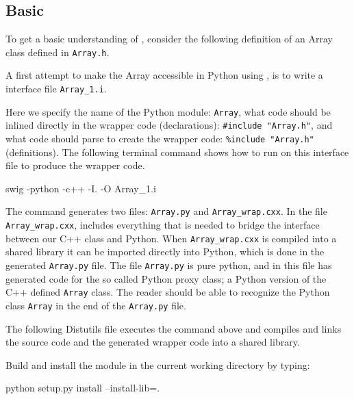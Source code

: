 \subsection{Basic \swig}
To get a basic understanding of \swig, consider the following definition of an Array class defined in \texttt{Array.h}.

A first attempt to make the Array accessible in Python using \swig, is to write a \swig interface file \texttt{Array\_1.i}.

Here we specify the name of the Python module: \texttt{Array}, what code should be inlined directly in the wrapper code (declarations): \texttt{\#include "Array.h"}, and what code \swig should parse to create the wrapper code: \texttt{\%include "Array.h"} (definitions). The following terminal command shows how to run \swig on this interface file to produce the wrapper code.
\begin{bash}
swig -python -c++ -I. -O Array_1.i
\end{bash}
The command generates two files: \texttt{Array.py} and \texttt{Array\_}\texttt{wrap.cxx}. In the file \texttt{Array\_}\texttt{wrap.cxx}, \swig includes everything that is needed to bridge the interface between our C++ class and Python. When \texttt{Array\_wrap.cxx} is compiled into a shared library it can be imported directly into Python, which is done in the generated \texttt{Array.py} file. The file \texttt{Array.py} is  pure python, and in this file \swig has generated code for the so called Python proxy class; a Python version of the C++ defined \texttt{Array} class. The reader should be able to recognize the Python class \texttt{Array} in the end of the \texttt{Array.py} file. \par

The following Distutils file executes the \swig command above and compiles and links the source code and the generated wrapper code into a shared library.

Build and install the module in the current working directory by typing:
\begin{bash}
python setup.py install --install-lib=.
\end{bash}

